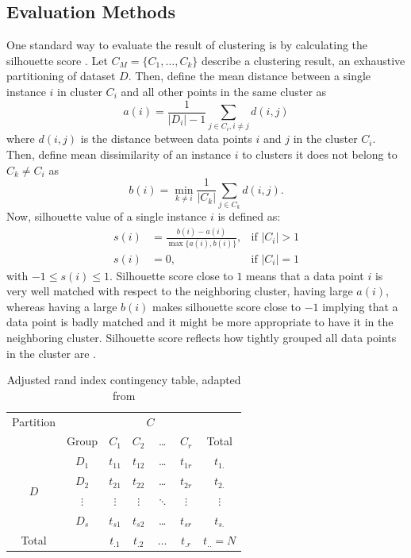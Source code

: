 
\subsection{Evaluation Methods}
\label{sec:clus_evaluation}

One standard way to evaluate the result of clustering is by
calculating the silhouette score \citep{reynolds2006clustering}. 
Let $C_M = \{C_1, \dots, C_k\}$ describe a clustering result, an 
exhaustive partitioning of dataset $D$. Then, define the mean distance
between a single instance $i$ in cluster $C_i$ and all other points in the same cluster as
$$
a(i) = \frac{1}{|D_i| - 1} \sum_{j \in C_i, i \neq j} d(i, j)
$$
where $d(i, j)$ is the distance between data points $i$ and $j$ in
the cluster $C_i$. Then, define mean dissimilarity of an instance $i$ to
clusters it does not belong to $C_k \neq C_i$ as
$$
b(i) = \min_{k \neq i} \frac{1}{|C_k|} \sum_{j \in C_k} d(i, j).
$$
Now, silhouette value of a single instance $i$ is defined as:
\begin{align}\label{eq:silhouette}
	s(i) &= \frac{b(i) - a(i)}{\max\{a(i), b(i)\}}, & \textrm{if } |C_i| > 1 \\
	s(i) &= 0, & \textrm{if } |C_i| = 1
\end{align}
with $-1 \leq s(i) \leq 1$. Silhouette score close to $1$ means that a data point $i$
is very well matched with respect to the neighboring cluster, having large $a(i)$, whereas
having a large $b(i)$ makes silhouette score close to $-1$ implying that a data point is badly matched 
and it might be more appropriate to have it in the neighboring cluster. 
Silhouette score reflects how tightly grouped all data points in the cluster are
\citep{kaufman2009finding}.

\begin{table}
	\centering
	\begin{tabular}{c c c c c c c}
		\toprule
		Partition & & \multicolumn{4}{c}{$C$} & \\ \cline{3-6}
		& Group & $C_1$ & $C_2$ & \dots & $C_r$ & Total \\
		\midrule
		\multirow{4}{*}{$D$} & $D_1$ & $t_{11}$ & $t_{12}$ & \dots & $t_{1r}$ & $t_{1.}$ \\
		                     & $D_2$ & $t_{21}$ & $t_{22}$ & \dots & $t_{2r}$ & $t_{2.}$ \\
				     & $\vdots$ & $\vdots$ & $\vdots$ & $\ddots$ & $\vdots$ & $\vdots$ \\
		                     & $D_s$ & $t_{s1}$ & $t_{s2}$ & \dots & $t_{sr}$ & $t_{s.}$ \\
				     \midrule
		Total & &                      $t_{.1}$ & $t_{.2}$ & $\dots$&$t_{.r}$ & $t_{..} = N$ \\
				     \bottomrule
	\end{tabular}
	\caption{Adjusted rand index contingency table, adapted from \citep{santos2009use}}
	\label{tab:adjusted_rand}
\end{table}


